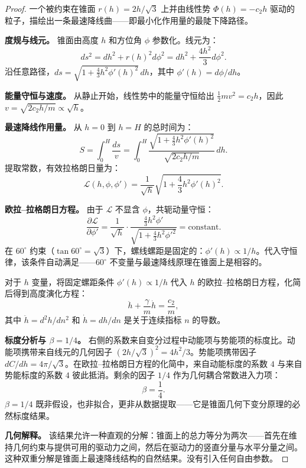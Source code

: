 \documentclass[12pt,a4paper]{article}
\begin{document}
\begin{proof}
一个被约束在锥面 $r(h) = 2h/\sqrt{3}$ 上并由线性势 $\Phi(h) = -c_2 h$ 驱动的粒子，描绘出一条最速降线曲——即最小化作用量的最陡下降路径。

\textbf{度规与线元。} 锥面由高度 $h$ 和方位角 $\phi$ 参数化。线元为：
\begin{equation}
ds^2 = dh^2 + r(h)^2 d\phi^2 = dh^2 + \frac{4h^2}{3} d\phi^2.
\end{equation}
沿任意路径，$ds = \sqrt{1 + \frac{4}{3}h^2 \phi'(h)^2}\, dh$，其中 $\phi'(h) = d\phi/dh$。

\textbf{能量守恒与速度。} 从静止开始，线性势中的能量守恒给出 $\frac{1}{2}mv^2 = c_2 h$，因此 $v = \sqrt{2c_2 h/m} \propto \sqrt{h}$。

\textbf{最速降线作用量。} 从 $h=0$ 到 $h=H$ 的总时间为：
\begin{equation}
S = \int_0^H \frac{ds}{v} = \int_0^H \frac{\sqrt{1 + \frac{4}{3}h^2 \phi'(h)^2}}{\sqrt{2c_2 h/m}}\, dh.
\end{equation}
提取常数，有效拉格朗日量为：
\begin{equation}
\mathcal{L}(h, \phi, \phi') = \frac{1}{\sqrt{h}} \sqrt{1 + \frac{4}{3}h^2 \phi'(h)^2}.
\end{equation}

\textbf{欧拉--拉格朗日方程。} 由于 $\mathcal{L}$ 不显含 $\phi$，共轭动量守恒：
\begin{equation}
\frac{\partial \mathcal{L}}{\partial \phi'} = \frac{1}{\sqrt{h}} \cdot \frac{\frac{4}{3}h^2 \phi'}{\sqrt{1 + \frac{4}{3}h^2 \phi'^2}} = \text{constant}.
\end{equation}
在 $60^\circ$ 约束（$\tan 60^\circ = \sqrt{3}$）下，螺线螺距是固定的：$\phi'(h) \propto 1/h$。代入守恒律，该条件自动满足——$60^\circ$ 不变量与最速降线原理在锥面上是相容的。

对于 $h$ 变量，将固定螺距条件 $\phi'(h) \propto 1/h$ 代入 $h$ 的欧拉--拉格朗日方程，化简后得到高度演化方程：
\begin{equation}
\ddot{h} + \frac{\gamma}{m}\dot{h} = \frac{c_2}{m},
\end{equation}
其中 $\ddot{h} = d^2h/dn^2$ 和 $\dot{h} = dh/dn$ 是关于连续指标 $n$ 的导数。

\textbf{标度分析与 $\beta = 1/4$。} 右侧的系数来自变分过程中动能项与势能项的标度比。动能项携带来自线元的几何因子 $(2h/\sqrt{3})^2 = 4h^2/3$。势能项携带因子 $dC/dh = 4\pi/\sqrt{3}$。在欧拉--拉格朗日方程的化简中，来自动能标度的系数 $4$ 与来自势能标度的系数 $4$ 彼此抵消。剩余的因子 $1/4$ 作为几何耦合常数进入力项：
\begin{equation}
\beta = \frac{1}{4}.
\end{equation}
$\beta = 1/4$ 既非假设，也非拟合，更非从数据提取——它是锥面几何下变分原理的必然标度结果。

\textbf{几何解释。} 该结果允许一种直观的分解：锥面上的总力等分为两次——首先在维持几何约束与提供可用的驱动力之间，然后在驱动力的竖直分量与水平分量之间。这种双重分解是锥面上最速降线结构的自然结果。没有引入任何自由参数。
\end{proof}
\end{document}
